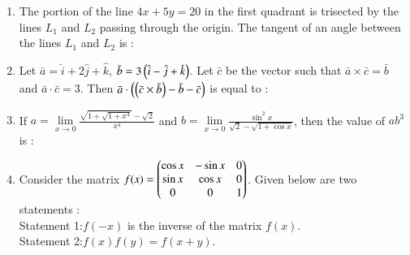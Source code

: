 \documentclass[journal]{IEEEtran}
\begin{document}
\begin{enumerate}[start=16]
\item The portion of the line $4x+5y=20$ in the first quadrant is trisected by the lines $L_1$ and $L_2$ passing through the origin. The tangent of an angle between the lines $L_1$ and $L_2$ is :
\begin{enumerate}
\end{enumerate}

\item Let $\bar{a} = \hat{i} + 2\hat{j} + \hat{k}$, $\bar{b} = 3\left(\hat{i} - \hat{j} + \hat{k}\right)$. Let $\bar{c}$ be the vector such that $\bar{a} \times \bar{c}=\bar{b}$ and $\bar{a} \cdot \bar{c}=3$. Then $\bar{a} \cdot \left(\left(\bar{c} \times \bar{b}\right)-\bar{b}-\bar{c}\right)$ is equal to :
\begin{enumerate}
\end{enumerate}

\item If $a=\lim\limits_{x\to 0}\frac{\sqrt{1+\sqrt{1+x^4}}-\sqrt{2}}{x^4}$ and $b=\lim\limits_{x\to 0}\frac{\sin^2{x}}{\sqrt{2}-\sqrt{1+\cos x}}$, then the value of $ab^{3}$ is : 
\begin{enumerate}
\end{enumerate}

\item Consider the matrix $f(x)=\begin{pmatrix} \cos x& -\sin x &0\\\sin x &\cos x&0\\ 0&0&1\end{pmatrix}$. Given below are two statements :\\
Statement 1:$f(-x)$ is the inverse of the matrix $f(x)$.\\
Statement 2:$f(x)f(y)=f(x+y)$.\\


\end{enumerate}
\end{document}
